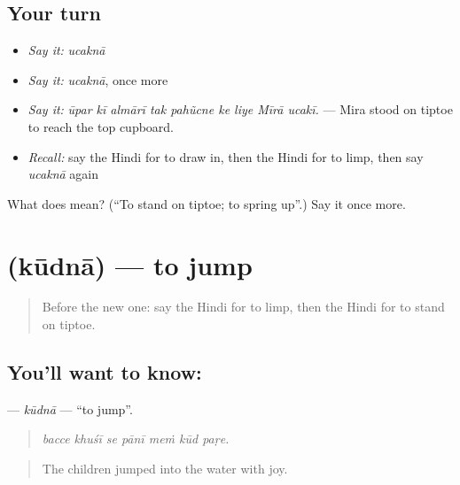 \subsection*{Your turn}
\begin{itemize}
\raggedright
  \item \emph{Say it:} \emph{ucaknā}
  \item \emph{Say it:} \emph{ucaknā}, once more
  \item \emph{Say it:} \emph{ūpar kī almārī tak pahũcne ke liye Mīrā ucakī.} — Mira stood on tiptoe to reach the top cupboard.
  \item \emph{Recall:} say the Hindi for to draw in, then the Hindi for to limp, then say \emph{ucaknā} again
\end{itemize}

\begin{tcolorbox}[breakable,colback=teal!4,colframe=teal!35!black,title={Before you move on}]
What does  mean? (\textquotedblleft{}To stand on tiptoe; to spring up\textquotedblright{}.) Say it once more.
\end{tcolorbox}
\section[\texorpdfstring{\hi{कूदना} (kūdnā)}{कूदना (kūdnā)}]{ (kūdnā) — to jump}

\label{lesson:HI-C481-kudna}



\begin{quote}
Before the new one: say the Hindi for to limp, then the Hindi for to stand on tiptoe.
\end{quote}

\subsection*{You'll want to know: }
\textbf{} — \emph{kūdnā} — \textquotedblleft{}to jump\textquotedblright{}.

\begin{quote}
      
\end{quote}

\begin{quote}
\emph{bacce khuśī se pānī meṁ kūd paṛe.}
\end{quote}

\begin{quote}
The children jumped into the water with joy.
\end{quote}

